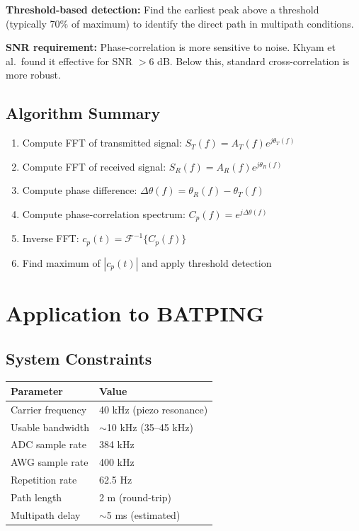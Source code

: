 \documentclass[11pt]{article}
\begin{document}
\textbf{Threshold-based detection:} Find the earliest peak above a threshold (typically 70\% of maximum) to identify the direct path in multipath conditions.

\textbf{SNR requirement:} Phase-correlation is more sensitive to noise. Khyam et al.\ found it effective for SNR $> 6$ dB. Below this, standard cross-correlation is more robust.

\subsection{Algorithm Summary}

\begin{enumerate}
    \item Compute FFT of transmitted signal: $S_T(f) = A_T(f) e^{j\theta_T(f)}$
    \item Compute FFT of received signal: $S_R(f) = A_R(f) e^{j\theta_R(f)}$
    \item Compute phase difference: $\Delta\theta(f) = \theta_R(f) - \theta_T(f)$
    \item Compute phase-correlation spectrum: $C_p(f) = e^{j\Delta\theta(f)}$
    \item Inverse FFT: $c_p(t) = \mathcal{F}^{-1}\{C_p(f)\}$
    \item Find maximum of $|c_p(t)|$ and apply threshold detection
\end{enumerate}

\section{Application to BATPING}

\subsection{System Constraints}

\begin{center}
\begin{tabular}{ll}
\toprule
Parameter & Value \\
\midrule
Carrier frequency & 40 kHz (piezo resonance) \\
Usable bandwidth & $\sim$10 kHz (35--45 kHz) \\
ADC sample rate & 384 kHz \\
AWG sample rate & 400 kHz \\
Repetition rate & 62.5 Hz \\
Path length & 2 m (round-trip) \\
Multipath delay & $\sim$5 ms (estimated) \\
\bottomrule
\end{tabular}
\end{center}
\end{document}
